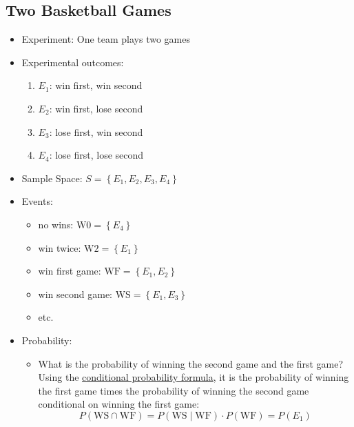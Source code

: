 \documentclass[
]{book}
\providecommand{\tightlist}{%
  \setlength{\itemsep}{0pt}\setlength{\parskip}{0pt}}
\begin{document}
\hypertarget{two-basketball-games}{%
\subsection{Two Basketball Games}\label{two-basketball-games}}

\begin{itemize}
\tightlist
\item
  Experiment: One team plays two games
\item
  Experimental outcomes:

  \begin{enumerate}
  \def\labelenumi{\arabic{enumi}.}
  \tightlist
  \item
    \(E_1\): win first, win second
  \item
    \(E_2\): win first, lose second
  \item
    \(E_3\): lose first, win second
  \item
    \(E_4\): lose first, lose second
  \end{enumerate}
\item
  Sample Space: \(S=\left\{E_1, E_2, E_3, E_4\right\}\)
\item
  Events:

  \begin{itemize}
  \tightlist
  \item
    no wins: \(\text{W0} = \left\{E_4\right\}\)
  \item
    win twice: \(\text{W2} = \left\{E_1\right\}\)
  \item
    win first game: \(\text{WF} = \left\{E_1, E_2\right\}\)
  \item
    win second game: \(\text{WS} = \left\{E_1, E_3\right\}\)
  \item
    etc.
  \end{itemize}
\item
  Probability:

  \begin{itemize}
  \tightlist
  \item
    What is the probability of winning the second game and the first game? Using the \href{https://fanwangecon.github.io/Stat4Econ/probability/htmlpdfr/samplespace.html}{conditional probability formula}, it is the probability of winning the first game times the probability of winning the second game conditional on winning the first game:
    \[P(\text{WS} \cap \text{WF}) = P(\text{WS} \mid \text{WF}) \cdot P(\text{WF}) = P(E_1)\]


\end{itemize}
\end{itemize}
\end{document}
